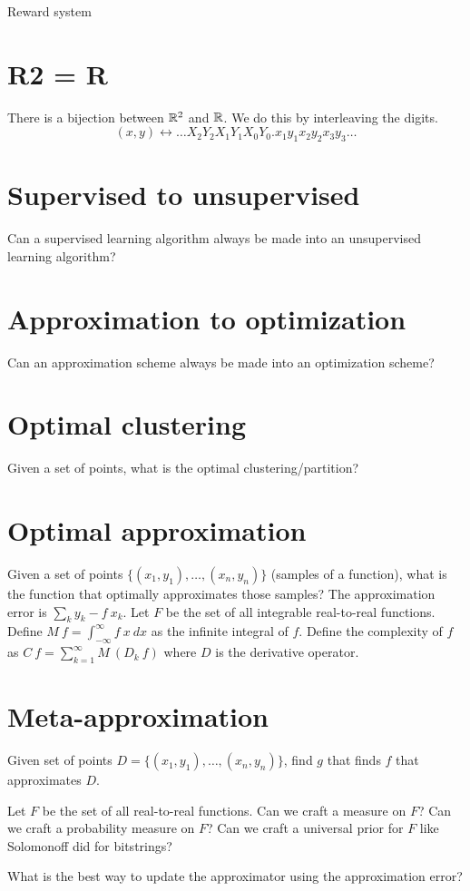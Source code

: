 Reward system

\section{R2 = R}

There is a bijection between \(\mathbb{R}^2\) and \(\mathbb{R}\).
We do this by interleaving the digits.
\[
    (x, y) \leftrightarrow \ldots X_2 Y_2 X_1 Y_1 X_0 Y_0 . x_1 y_1 x_2 y_2 x_3 y_3 \ldots
\]

\section{Supervised to unsupervised}

Can a supervised learning algorithm always be made into an unsupervised learning algorithm?

\section{Approximation to optimization}

Can an approximation scheme always be made into an optimization scheme?

\section{Optimal clustering}

Given a set of points, what is the optimal clustering/partition?

\section{Optimal approximation}

Given a set of points
\(\{(x_1,y_1),\ldots,(x_n,y_n)\}\)
(samples of a function),
what is the function that optimally approximates those samples?
The approximation error is \(\sum_k y_k - f~x_k \).
Let \(F\) be the set of all integrable real-to-real functions.
Define \(M~f = \int_{-\infty}^\infty f~x~dx\) as the infinite integral of \(f\).
Define the complexity of \(f\)
as \(C~f = \sum_{k=1}^\infty M~(D_k~f)\)
where \(D\) is the derivative operator.

\section{Meta-approximation}

Given set of points
\(D = \{(x_1,y_1),\ldots,(x_n,y_n)\}\),
find \(g\) that finds \(f\) that approximates \(D\).

Let \(F\) be the set of all real-to-real functions.
Can we craft a measure on \(F\)?
Can we craft a probability measure on \(F\)?
Can we craft a universal prior for \(F\) like Solomonoff did for bitstrings?

What is the best way to update the approximator using the approximation error?
